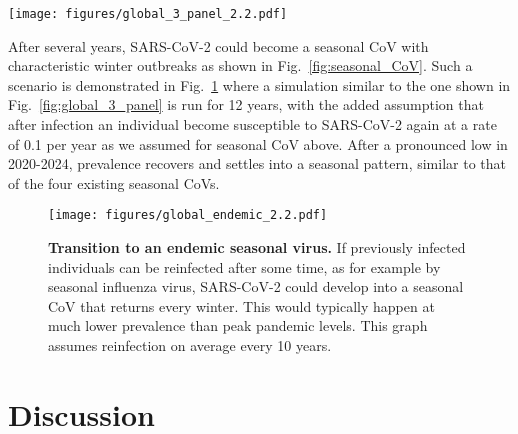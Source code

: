 \documentclass[rmp, reprint, superscriptaddress, floatfix,amsmath]{revtex4-1}
\newcommand{\forcing}{\varepsilon}
\begin{document}
\begin{figure*}[tb]
    \centering
    \texttt{[image: figures/global\_3\_panel\_2.2.pdf]}
    \caption{{\bf Extended circulation through overlapping epidemics in variable subpopulations.} These simulations of a pandemic scenario assume 1,000 sub-populations with an average $\langle R_0\rangle$ of 2.2 and standard deviation $0.5$, 40\% of which have weak seasonal forcing $\forcing \in [0,0.2]$ (tropical) and the remainder have strong variation with $\forcing \in [0.25,0.75]$. The super-position of many variable epidemics can result in a global prevalence that decays only slowly through 2020 and 2021. 
    Lighter lines have lower $R_0$, darker lines have higher $R_0$. 
    The actual observed case counts reported for Hubei are added (brown line) and multiplied by three to account for possible under-reporting of mild cases. A subset of 30 randomly chosen simulations are plotted for each region.
    Analogous figures for different $R_0$ parameter values are shown in Supplementary Fig.~\ref{fig:global_3_panel_supp}.}
    \label{fig:global_3_panel}
\end{figure*}

After several years, SARS-CoV-2 could become a seasonal CoV with characteristic winter outbreaks as shown in Fig.~\ref{fig:seasonal_CoV}.
Such a scenario is demonstrated in Fig.~\ref{fig:endemic} where a simulation similar to the one shown in Fig.~\ref{fig:global_3_panel} is run for 12 years, with the added assumption that after infection an individual become susceptible to SARS-CoV-2 again at a rate of 0.1 per year as we assumed for seasonal CoV above. 
After a pronounced low in 2020-2024, prevalence recovers and settles into a seasonal pattern, similar to that of the four existing seasonal CoVs. 

\begin{figure}
    \centering
    \texttt{[image: figures/global\_endemic\_2.2.pdf]}
    \caption{{\bf Transition to an endemic seasonal virus.} 
    If previously infected individuals can be reinfected after some time, as for example by seasonal influenza virus, SARS-CoV-2 could develop into a seasonal CoV that returns every winter. This would typically happen at much lower prevalence than peak pandemic levels. 
    This graph assumes reinfection on average every 10 years.}
    \label{fig:endemic}
\end{figure}

\section{Discussion}
\end{document}
